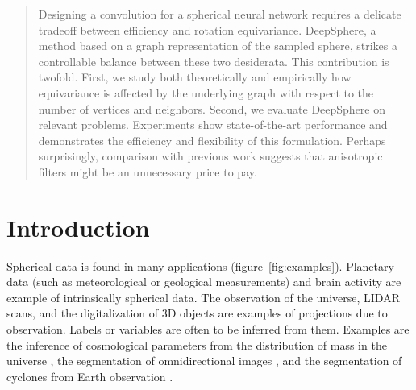 \documentclass{article} %
\newcommand{\figref}[1]{figure~\ref{fig:#1}}
\begin{document}
\begin{abstract}
Designing a convolution for a spherical neural network requires a delicate tradeoff between efficiency and rotation equivariance.
DeepSphere, a method based on a graph representation of the sampled sphere, strikes a controllable balance between these two desiderata.
This contribution is twofold.
First, we study both theoretically and empirically how equivariance is affected by the underlying graph with respect to the number of vertices and neighbors.
Second, we evaluate DeepSphere on relevant problems.
Experiments show state-of-the-art performance and demonstrates the efficiency and flexibility of this formulation.
Perhaps surprisingly, comparison with previous work suggests that anisotropic filters might be an unnecessary price to pay.
\end{abstract}

\section{Introduction}

Spherical data is found in many applications (\figref{examples}).
Planetary data (such as meteorological or geological measurements) and brain activity are example of intrinsically spherical data.
The observation of the universe, LIDAR scans, and the digitalization of 3D objects are examples of projections due to observation.
Labels or variables are often to be inferred from them.
Examples are the inference of cosmological parameters from the distribution of mass in the universe \citep{perraudin2019deepspherecosmo}, the segmentation of omnidirectional images \citep{khasanova2017sphericalcnn}, and the segmentation of cyclones from Earth observation \citep{mudigonda2017climateevents}.
\end{document}
